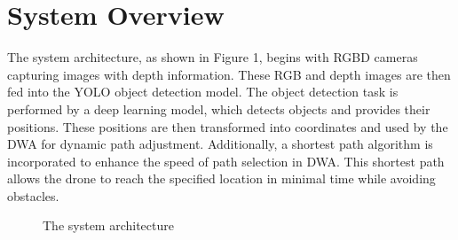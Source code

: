 \documentclass[crop=false]{standalone}
\begin{document}
	\section{System Overview}
	
	The system architecture, as shown in Figure 1, begins with RGBD cameras capturing images with depth information. These RGB and depth images are then fed into the YOLO object detection model. The object detection task is performed by a deep learning model, which detects objects and provides their positions. These positions are then transformed into coordinates and used by the DWA for dynamic path adjustment. Additionally, a shortest path algorithm is incorporated to enhance the speed of path selection in DWA. This shortest path allows the drone to reach the specified location in minimal time while avoiding obstacles.

	\begin{figure*}[thbp!]
		\centering
		\caption{The system architecture}
		\label{fig:system}
	\end{figure*}
\end{document}
